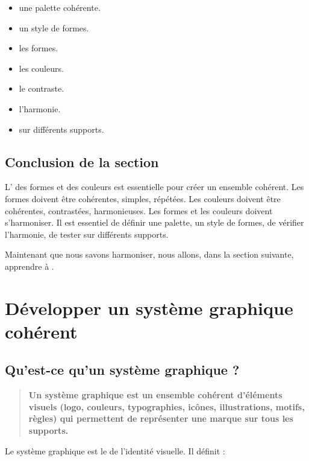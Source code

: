 \begin{itemize}
    \item {} une palette cohérente.
    \item {} un style de formes.
    \item {} les formes.
    \item {} les couleurs.
    \item {} le contraste.
    \item {} l'harmonie.
    \item {} sur différents supports.
\end{itemize}

\subsection*{Conclusion de la section}

L' des formes et des couleurs est essentielle pour créer un ensemble cohérent. Les formes doivent être cohérentes, simples, répétées. Les couleurs doivent être cohérentes, contrastées, harmonieuses. Les formes et les couleurs doivent s'harmoniser. Il est essentiel de définir une palette, un style de formes, de vérifier l'harmonie, de tester sur différents supports.

Maintenant que nous savons harmoniser, nous allons, dans la section suivante, apprendre à .

\section{Développer un système graphique cohérent}

\subsection{Qu'est-ce qu'un système graphique ?}

\begin{quote}
\textbf{Un système graphique est un ensemble cohérent d'éléments visuels (logo, couleurs, typographies, icônes, illustrations, motifs, règles) qui permettent de représenter une marque sur tous les supports.}
\end{quote}

Le système graphique est le  de l'identité visuelle. Il définit :

